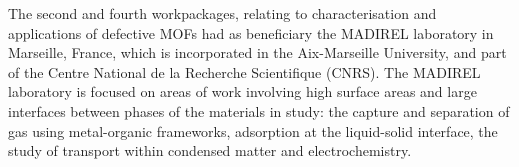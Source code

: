 The second and fourth workpackages, relating to characterisation and
applications of defective \glspl{MOF} had as beneficiary the MADIREL 
laboratory in Marseille, France, which is incorporated in the
Aix-Marseille University, and part of the Centre
National de la Recherche Scientifique (CNRS). The MADIREL 
laboratory is focused on areas of work involving high surface
areas and large interfaces between phases of the materials in 
study: the capture and separation of gas using metal-organic 
frameworks, adsorption at the liquid-solid interface,
the study of transport within condensed matter and electrochemistry.

\pagebreak


